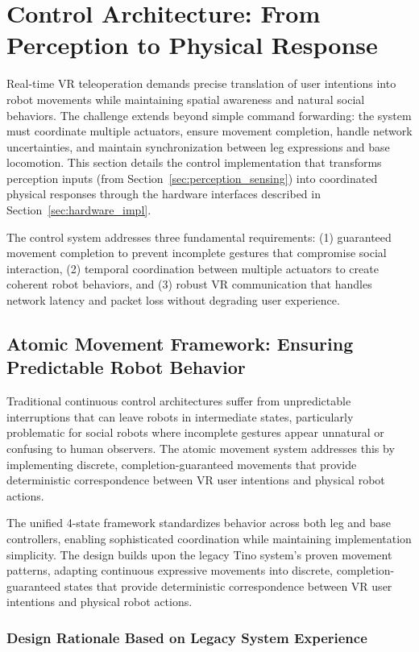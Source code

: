 \section{Control Architecture: From Perception to Physical Response}
\label{sec:control_implementation}
Real-time VR teleoperation demands precise translation of user intentions into robot movements while maintaining spatial awareness and natural social behaviors. The challenge extends beyond simple command forwarding: the system must coordinate multiple actuators, ensure movement completion, handle network uncertainties, and maintain synchronization between leg expressions and base locomotion. This section details the control implementation that transforms perception inputs (from Section~\ref{sec:perception_sensing}) into coordinated physical responses through the hardware interfaces described in Section~\ref{sec:hardware_impl}.

The control system addresses three fundamental requirements: (1) guaranteed movement completion to prevent incomplete gestures that compromise social interaction, (2) temporal coordination between multiple actuators to create coherent robot behaviors, and (3) robust VR communication that handles network latency and packet loss without degrading user experience.

\subsection{Atomic Movement Framework: Ensuring Predictable Robot Behavior}

Traditional continuous control architectures suffer from unpredictable interruptions that can leave robots in intermediate states, particularly problematic for social robots where incomplete gestures appear unnatural or confusing to human observers. The atomic movement system addresses this by implementing discrete, completion-guaranteed movements that provide deterministic correspondence between VR user intentions and physical robot actions.

The unified 4-state framework standardizes behavior across both leg and base controllers, enabling sophisticated coordination while maintaining implementation simplicity. The design builds upon the legacy Tino system's proven movement patterns, adapting continuous expressive movements into discrete, completion-guaranteed states that provide deterministic correspondence between VR user intentions and physical robot actions.

\subsubsection{Design Rationale Based on Legacy System Experience}

